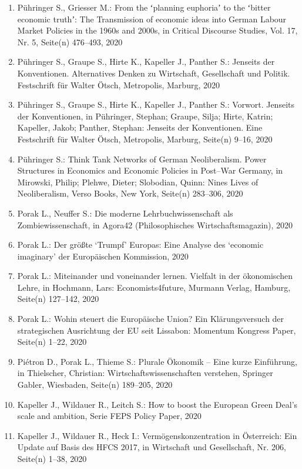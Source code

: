 \begin{enumerate}
	 \item Pühringer S., Griesser M.: From the ʻplanning euphoriaʼ to the ʻbitter economic truthʼ: The Transmission of economic ideas into German Labour Market Policies in the 1960s and 2000s, in Critical Discourse Studies, Vol. 17, Nr. 5, Seite(n) 476--493, 2020
	 \item Pühringer S., Graupe S., Hirte K., Kapeller J., Panther S.: Jenseits der Konventionen. Alternatives Denken zu Wirtschaft, Gesellschaft und Politik. Festschrift für Walter Ötsch, Metropolis, Marburg, 2020
	 \item Pühringer S., Graupe S., Hirte K., Kapeller J., Panther S.: Vorwort. Jenseits der Konventionen, in Pühringer, Stephan; Graupe, Silja; Hirte, Katrin; Kapeller, Jakob; Panther, Stephan: Jenseits der Konventionen. Eine Festschrift für Walter Ötsch, Metropolis, Marburg, Seite(n) 9--16, 2020
	 \item Pühringer S.: Think Tank Networks of German Neoliberalism. Power Structures in Economics and Economic Policies in Post--War Germany, in Mirowski, Philip; Plehwe, Dieter; Slobodian, Quinn: Nines Lives of Neoliberalism, Verso Books, New York, Seite(n) 283--306, 2020
	 \item Porak L., Neuffer S.: Die moderne Lehrbuchwissenschaft als Zombiewissenschaft, in Agora42 (Philosophisches Wirtschaftsmagazin), 2020
	 \item Porak L.: Der größte ‘Trumpf’ Europas: Eine Analyse des ‘economic imaginary’ der Europäischen Kommission, 2020
	 \item Porak L.: Miteinander und voneinander lernen. Vielfalt in der ökonomischen Lehre, in Hochmann, Lars: Economists4future, Murmann Verlag, Hamburg, Seite(n) 127--142, 2020
	 \item Porak L.: Wohin steuert die Europäische Union? Ein Klärungsversuch der strategischen Ausrichtung der EU seit Lissabon: Momentum Kongress Paper, Seite(n) 1--22, 2020
	 \item Piétron D., Porak L., Thieme S.: Plurale Ökonomik -- Eine kurze Einführung, in Thielscher, Christian: Wirtschaftswissenschaften verstehen, Springer Gabler, Wiesbaden, Seite(n) 189--205, 2020
	 \item Kapeller J., Wildauer R., Leitch S.: How to boost the European Green Deal’s scale and ambition, Serie FEPS Policy Paper, 2020
	 \item Kapeller J., Wildauer R., Heck I.: Vermögenskonzentration in Österreich: Ein Update auf Basis des HFCS 2017, in Wirtschaft und Gesellschaft, Nr. 206, Seite(n) 1--38, 2020

\end{enumerate}
